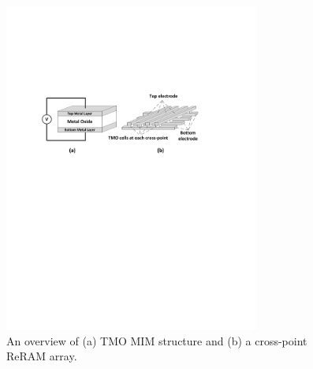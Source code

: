 \begin{figure}[!t]
\centering
    \includegraphics[width=3.3in]{./fig/DATE1.pdf}
\caption{An overview of (a) TMO MIM structure and (b) a cross-point ReRAM array.}
\label{fig:overview}
\end{figure}

